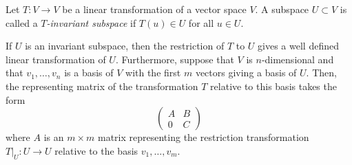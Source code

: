 \documentclass[12pt]{article}
\begin{document}
Let $T: V\rightarrow V$ be a linear transformation of a vector space $V$.   A subspace $U\subset V$ is
called a {\em $T$-invariant subspace} if $T(u)\in U$ for all $u\in U$.

If $U$ is an invariant subspace, then the restriction of $T$ to $U$
gives a well defined linear transformation of $U$.  Furthermore,
suppose that $V$ is $n$-dimensional and that $v_1,\ldots, v_n$ is a
basis of $V$ with the first $m$ vectors giving a basis of $U$.  Then,
the representing matrix of the transformation $T$ relative to this
basis takes the form
$$
\begin{pmatrix}
  A & B \\
  0 & C
\end{pmatrix}$$
where $A$ is an $m\times m$ matrix representing the restriction
transformation $T\big|_U:U\to U$ relative to the basis $v_1,\ldots, v_m$.
\end{document}
